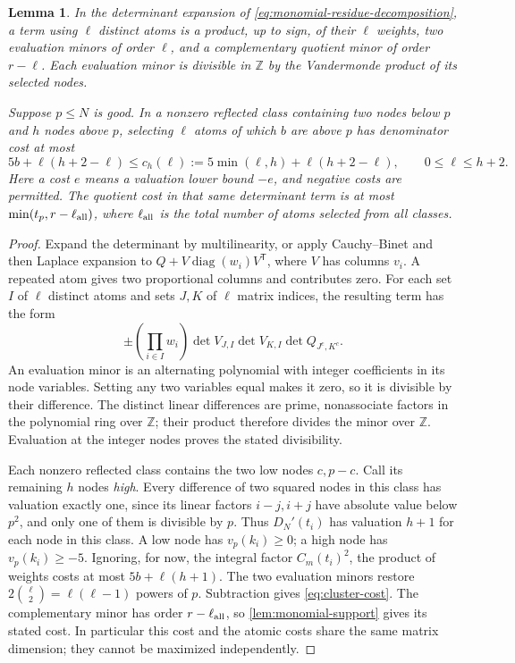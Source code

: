 \documentclass[11pt,letterpaper]{article}
\newtheorem{lemma}[lemma]{Lemma}
\theoremstyle{definition}
\newcommand{\Z}{\mathbb Z}
\begin{document}
\begin{lemma}\label{lem:mixed-minors}
In the determinant expansion of \eqref{eq:monomial-residue-decomposition},
a term using $\ell$ distinct atoms is a product, up to sign, of
their $\ell$ weights, two evaluation minors of order $\ell$, and
a complementary quotient minor of order $r-\ell$.
Each evaluation minor is divisible in $\Z$ by the Vandermonde
product of its selected nodes.

Suppose $p\le N$ is good. In a nonzero reflected class containing
two nodes below $p$ and $h$ nodes above $p$, selecting $\ell$
atoms of which $b$ are above $p$ has denominator cost at most
\begin{equation}\label{eq:cluster-cost}
 5b+\ell(h+2-\ell)
 \le c_h(\ell):=5\min(\ell,h)+\ell(h+2-\ell),
 \qquad 0\le\ell\le h+2.
\end{equation}
Here a cost $e$ means a valuation lower bound $-e$, and negative
costs are permitted. The quotient cost in that same determinant
term is at most $\min(t_p,r-\ell_{\rm all})$, where
$\ell_{\rm all}$ is the total number of atoms selected from all classes.
\end{lemma}
\begin{proof}
Expand the determinant by multilinearity, or apply Cauchy--Binet and
then Laplace expansion to $Q+V\operatorname{diag}(w_i)V^{\mathsf T}$,
where $V$ has columns $v_i$. A repeated atom gives two proportional
columns and contributes zero. For each set $I$ of $\ell$ distinct
atoms and sets $J,K$ of $\ell$ matrix indices, the resulting term
has the form
\[
 \pm\left(\prod_{i\in I}w_i\right)
 \det V_{J,I}\det V_{K,I}\det Q_{J^c,K^c}.
\]
An evaluation minor is an alternating polynomial with integer
coefficients in its node variables. Setting any two variables equal
makes it zero, so it is divisible by their difference. The distinct
linear differences are prime, nonassociate factors in the polynomial
ring over $\Z$; their product therefore divides the minor over $\Z$.
Evaluation at the integer nodes proves the stated divisibility.

Each nonzero reflected class contains the two low nodes $c,p-c$.
Call its remaining $h$ nodes \emph{high}. Every difference of two
squared nodes in this class has valuation exactly one, since its
linear factors $i-j,i+j$ have absolute value below $p^2$, and only
one of them is divisible by $p$. Thus $D_N'(t_i)$ has valuation
$h+1$ for each node in this class. A low node has $v_p(k_i)\ge0$;
a high node has $v_p(k_i)\ge-5$. Ignoring, for now, the integral
factor $C_m(t_i)^2$, the product of weights costs at most
$5b+\ell(h+1)$. The two evaluation minors restore
$2\binom\ell2=\ell(\ell-1)$ powers of $p$. Subtraction gives
\eqref{eq:cluster-cost}. The complementary minor has order
$r-\ell_{\rm all}$, so \cref{lem:monomial-support} gives its stated
cost. In particular this cost and the atomic costs share the same
matrix dimension; they cannot be maximized independently.
\end{proof}
\end{document}
